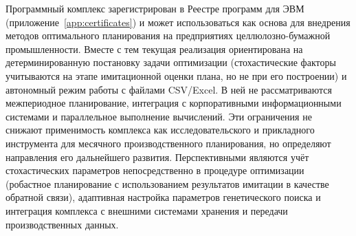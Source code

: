 Программный комплекс зарегистрирован в Реестре программ для ЭВМ (приложение~\ref{app:certificates}) и может использоваться как основа для внедрения методов оптимального планирования на предприятиях целлюлозно-бумажной промышленности.
Вместе с тем текущая реализация ориентирована на детерминированную постановку задачи оптимизации (стохастические факторы учитываются на этапе имитационной оценки плана, но не при его построении) и автономный режим работы с файлами CSV/Excel. В ней не рассматриваются межпериодное планирование, интеграция с корпоративными информационными системами и параллельное выполнение вычислений. Эти ограничения не снижают применимость комплекса как исследовательского и прикладного инструмента для месячного производственного планирования, но определяют направления его дальнейшего развития. Перспективными являются учёт стохастических параметров непосредственно в процедуре оптимизации (робастное планирование с использованием результатов имитации в качестве обратной связи), адаптивная настройка параметров генетического поиска и интеграция комплекса с внешними системами хранения и передачи производственных данных.
